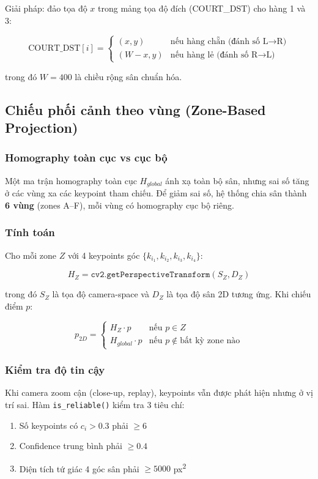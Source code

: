 \documentclass[12pt,a4paper]{article}
\begin{document}
Giải pháp: đảo tọa độ $x$ trong mảng tọa độ đích (COURT\_DST) cho hàng 1 và 3:

\begin{equation}
\text{COURT\_DST}[i] = \begin{cases}
    (x, y) & \text{nếu hàng chẵn (đánh số L}\to\text{R)} \\
    (W - x, y) & \text{nếu hàng lẻ (đánh số R}\to\text{L)}
\end{cases}
\label{eq:zigzag}
\end{equation}

trong đó $W = 400$ là chiều rộng sân chuẩn hóa.

\subsection{Chiếu phối cảnh theo vùng (Zone-Based Projection)}
\label{sec:zone_projection}

\subsubsection{Homography toàn cục vs cục bộ}
Một ma trận homography toàn cục $H_{global}$ ánh xạ toàn bộ sân, nhưng sai số tăng ở các vùng xa các keypoint tham chiếu. Để giảm sai số, hệ thống chia sân thành \textbf{6 vùng} (zones A--F), mỗi vùng có homography cục bộ riêng.

\subsubsection{Tính toán}
Cho mỗi zone $Z$ với 4 keypoints góc $\{k_{i_1}, k_{i_2}, k_{i_3}, k_{i_4}\}$:

\begin{equation}
H_Z = \texttt{cv2.getPerspectiveTransform}(S_Z, D_Z)
\end{equation}

trong đó $S_Z$ là tọa độ camera-space và $D_Z$ là tọa độ sân 2D tương ứng. Khi chiếu điểm $p$:

\begin{equation}
p_{2D} = \begin{cases}
    H_Z \cdot p & \text{nếu } p \in Z \\
    H_{global} \cdot p & \text{nếu } p \notin \text{bất kỳ zone nào}
\end{cases}
\end{equation}

\subsubsection{Kiểm tra độ tin cậy}
Khi camera zoom cận (close-up, replay), keypoints vẫn được phát hiện nhưng ở vị trí sai. Hàm \texttt{is\_reliable()} kiểm tra 3 tiêu chí:
\begin{enumerate}[noitemsep]
    \item Số keypoints có $c_i > 0.3$ phải $\geq 6$
    \item Confidence trung bình phải $\geq 0.4$
    \item Diện tích tứ giác 4 góc sân phải $\geq 5000$ px\textsuperscript{2}
\end{enumerate}
\end{document}
